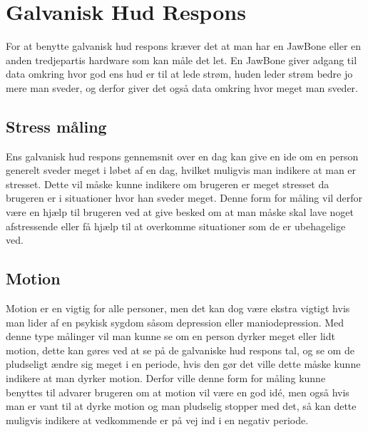 \section{Galvanisk Hud Respons}
For at benytte galvanisk hud respons kræver det at man har en JawBone eller en anden tredjepartis hardware som kan måle det let.
En JawBone giver adgang til data omkring hvor god ens hud er til at lede strøm, huden leder strøm bedre jo mere man sveder, og derfor giver det også data omkring hvor meget man sveder.

\subsection{Stress måling}
Ens galvanisk hud respons gennemsnit over en dag kan give en ide om en person generelt sveder meget i løbet af en dag, hvilket muligvis man indikere at man er stresset.
Dette vil måske kunne indikere om brugeren er meget stresset da brugeren er i situationer hvor han sveder meget.
Denne form for måling vil derfor være en hjælp til brugeren ved at give besked om at man måske skal lave noget afstressende eller få hjælp til at overkomme situationer som de er ubehagelige ved.

\subsection{Motion}
Motion er en vigtig for alle personer, men det kan dog være ekstra vigtigt hvis man lider af en psykisk sygdom såsom depression eller maniodepression.
Med denne type målinger vil man kunne se om en person dyrker meget eller lidt motion, dette kan gøres ved at se på de galvaniske hud respons tal, og se om de pludseligt ændre sig meget i en periode, hvis den gør det ville dette måske kunne indikere at man dyrker motion.
Derfor ville denne form for måling kunne benyttes til advarer brugeren om at motion vil være en god idé, men også hvis man er vant til at dyrke motion og man pludselig stopper med det, så kan dette muligvis indikere at vedkommende er på vej ind i en negativ periode.

